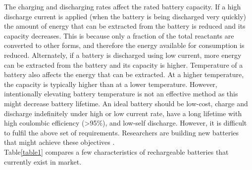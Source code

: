 The charging and discharging rates affect the rated battery capacity. If a high discharge current is applied (when the battery is being discharged very quickly) the amount of energy that can be extracted from the battery is reduced and its capacity decreases. This is because only a fraction of the total reactants are converted to other forms, and therefore the energy available for consumption is reduced. Alternately, if a battery is discharged using low current, more energy can be extracted from the battery and its capacity is higher. Temperature of a battery also affects the energy that can be extracted. At a higher temperature, the capacity is typically higher than at a lower temperature. However, intentionally elevating battery temperature is not an effective method as this might decrease battery lifetime\cite{leng_effect_2015, ma_temperature_2018}. 
An ideal battery should be low-cost, charge and discharge indefinitely under high or low current rate, have a long lifetime with high coulombic efficiency (>95\%), and low-self discharge. However, it is difficult to fulfil the above set of requirements. Researchers are building new batteries that might achieve these objectives \cite{slater_sodium-ion_2013,jian_carbon_2015,aurbach_prototype_2000,lin_ultrafast_2015-2}. \\

Table\ref{table1} compares a few characteristics of rechargeable batteries that currently exist in market. 

